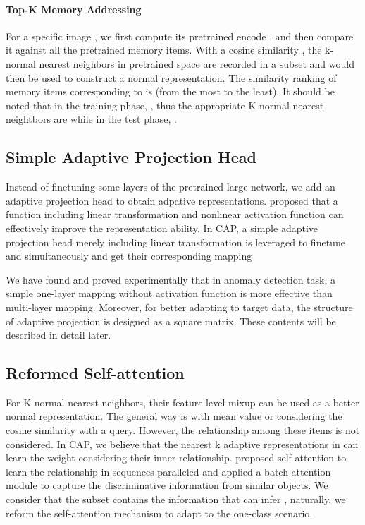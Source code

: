 \documentclass{article}
\begin{document}
\paragraph{Top-K Memory Addressing}
For a specific image , we first compute its pretrained encode , and then compare it against all the pretrained memory items. With a cosine similarity , the k-normal nearest neighbors in pretrained space are recorded in a subset  and would then be used to construct a normal representation. The similarity ranking of memory items corresponding to  is  (from the most to the least). It should be noted that in the training phase, , thus the appropriate K-normal nearest neightbors are   while in the test phase, .


\subsection{Simple Adaptive Projection Head}
Instead of finetuning some layers of the pretrained large network, we add an adaptive projection head  to obtain adpative representations. \cite{chen2020simple,tolstikhin2021mlp} proposed that a function including linear transformation and nonlinear activation function can effectively improve the representation ability. In CAP, a simple adaptive projection head merely including linear transformation is leveraged to finetune  and  simultaneously and get their corresponding mapping





We have found and proved experimentally that in anomaly detection task, a simple one-layer mapping without activation function is more effective than multi-layer mapping. Moreover, for better adapting to target data, the structure of adaptive projection is designed as a square matrix. These contents will be described in detail later.


\subsection{Reformed Self-attention}
For K-normal nearest neighbors, their feature-level mixup can be used as a better normal representation. The general way is with mean value or considering the cosine similarity with a query. However, the relationship among these items is not considered. In CAP, we believe that the nearest k adaptive representations in  can learn the weight considering their inner-relationship. \cite{vaswani2017attention} proposed self-attention to learn the relationship in sequences paralleled and \cite{su2019semantic} applied a batch-attention module to capture the discriminative information from similar objects. We consider that the subset  contains the information that can infer , naturally, we reform the self-attention mechanism to adapt to the one-class scenario. 
\end{document}
